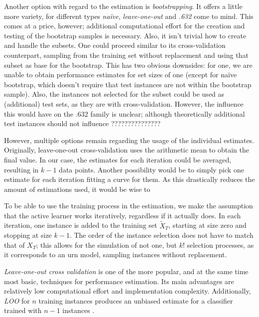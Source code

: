 Another option with regard to the estimation is \textit{bootstrapping}. It offers a little more variety, for different types \textit{na\"{i}ve}, \textit{leave-one-out} and \textit{.632} come to mind. This comes at a price, however; additional computational effort for the creation and testing of the bootstrap samples is necessary. Also, it isn't trivial how to create and handle the subsets. One could proceed similar to its cross-validation counterpart, sampling from the training set without replacement and using that subset as base for the bootstrap. This has two obvious downsides: for one, we are unable to obtain performance estimates for set sizes of one (except for na\"{i}ve bootstrap, which doesn't require that test instances are not within the bootstrap sample). Also, the instances not selected for the subset could be used as (additional) test sets, as they are with cross-validation. However, the influence this would have on the .632 family is unclear; although theoretically additional test instances should not influence ???????????????

However, multiple options remain regarding the usage of the individual estimates. Originally, leave-one-out cross-validation uses the arithmetic mean to obtain the final value. In our case, the estimates for each iteration could be averaged, resulting in $k-1$ data points. Another possibility would be to simply pick one estimate for each iteration fitting a curve for them. As this drastically reduces the amount of estimations used, it would be wise to 

To be able to use the training process in the estimation, we make the assumption that the active learner works iteratively, regardless if it actually does. In each iteration, one instance is added to the training set $\tilde{X}_T$, starting at size zero and stopping at size $k-1$. The order of the instance selection does not have to match that of $X_T$; this allows for the simulation of not one, but $k!$ selection processes, as it corresponds to an urn model, sampling instances without replacement.

\textit{Leave-one-out cross validation} is one of the more popular, and at the same time most basic, techniques for performance estimation. Its main advantages are relatively low computational effort and implementation complexity. Additionally, \textit{LOO} for $n$ training instances produces an unbiased estimate for a classifier trained with $n-1$ instances \cite{RodriguezEtAl2013}. 

\todots